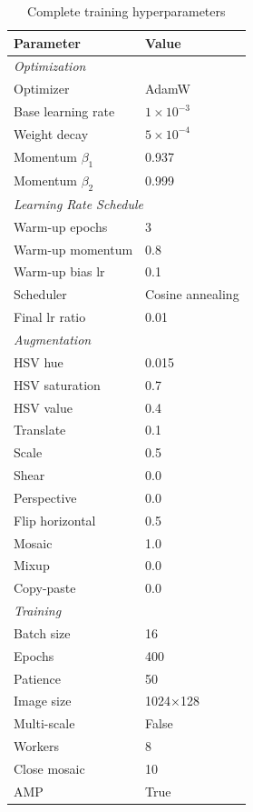 \begin{table}[h]
\centering
\caption{Complete training hyperparameters}
\begin{tabular}{ll}
\toprule
\textbf{Parameter} & \textbf{Value} \\
\midrule
\multicolumn{2}{l}{\textit{Optimization}} \\
Optimizer & AdamW \\
Base learning rate & $1 \times 10^{-3}$ \\
Weight decay & $5 \times 10^{-4}$ \\
Momentum $\beta_1$ & 0.937 \\
Momentum $\beta_2$ & 0.999 \\
\midrule
\multicolumn{2}{l}{\textit{Learning Rate Schedule}} \\
Warm-up epochs & 3 \\
Warm-up momentum & 0.8 \\
Warm-up bias lr & 0.1 \\
Scheduler & Cosine annealing \\
Final lr ratio & 0.01 \\
\midrule
\multicolumn{2}{l}{\textit{Augmentation}} \\
HSV hue & 0.015 \\
HSV saturation & 0.7 \\
HSV value & 0.4 \\
Translate & 0.1 \\
Scale & 0.5 \\
Shear & 0.0 \\
Perspective & 0.0 \\
Flip horizontal & 0.5 \\
Mosaic & 1.0 \\
Mixup & 0.0 \\
Copy-paste & 0.0 \\
\midrule
\multicolumn{2}{l}{\textit{Training}} \\
Batch size & 16 \\
Epochs & 400 \\
Patience & 50 \\
Image size & 1024×128 \\
Multi-scale & False \\
Workers & 8 \\
Close mosaic & 10 \\
AMP & True \\
\bottomrule
\end{tabular}
\end{table}

